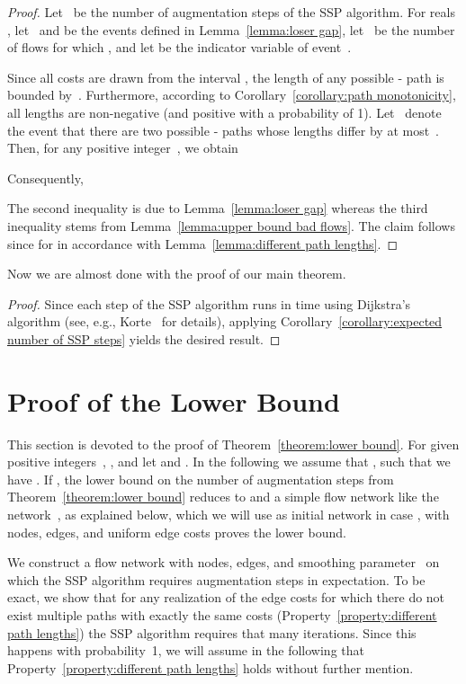 \documentclass[11pt]{article}
\begin{document}
\begin{proof}
Let~ be the number of augmentation steps of the SSP algorithm. For reals , let~ and  be the events defined in Lemma~\ref{lemma:loser gap}, let~ be the number of flows  for which , and let  be the indicator variable of event~.


Since all costs are drawn from the interval , the length of any possible - path is bounded by~. Furthermore, according to Corollary~\ref{corollary:path monotonicity}, all lengths are non-negative (and positive with a probability of 1). Let~ denote the event that there are two possible - paths whose lengths differ by at most~. Then, for any positive integer~, we obtain

Consequently,

The second inequality is due to Lemma~\ref{lemma:loser gap} whereas the third inequality stems from Lemma~\ref{lemma:upper bound bad flows}. The claim follows since  for  in accordance with Lemma~\ref{lemma:different path lengths}.
\end{proof}

Now we are almost done with the proof of our main theorem.

\begin{proof}
Since each step of the SSP algorithm runs in time  using Dijkstra's algorithm (see, e.g.,
Korte~\cite{Korte:2007:COT:1564997} for details), applying Corollary~\ref{corollary:expected number of SSP steps} yields the desired result. \end{proof}





\section{Proof of the Lower Bound}
\label{sec:lower bound}





This section is devoted to the proof of Theorem~\ref{theorem:lower bound}. For
given positive integers~, , and 
let  and . In the following we assume that , such that we have . If , the lower bound on the number of augmentation steps from Theorem~\ref{theorem:lower bound} reduces to  and a simple flow network like the network~, as explained below, which we will use as initial network in case , with  nodes,  edges, and uniform edge costs proves the lower bound.  

We construct a flow
network with  nodes,  edges, 
and smoothing parameter~ on
which the SSP algorithm requires  augmentation steps in expectation. To be
exact, we show that for any realization of the edge costs 
for which there do not exist multiple paths with exactly the same costs (Property~\ref{property:different path lengths}) 
the SSP algorithm requires that many iterations. Since this happens with probability~1,
we will assume in the following that Property~\ref{property:different path lengths} 
holds without further mention. 
\end{document}
